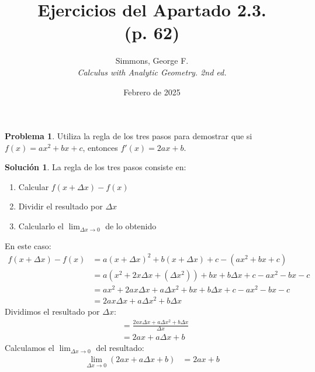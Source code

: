 \documentclass{article}
\theoremstyle{definition}
\newtheorem{problem}{Problema}
\newtheorem*{solution}{Solución}
\begin{document}
\title{Ejercicios del Apartado 2.3. \\ (p. 62)}
\author{Simmons, George F. \\ \textit{Calculus with Analytic Geometry. 2nd ed.}}
\date{Febrero de 2025}
\maketitle

\begin{problem}
Utiliza la regla de los tres pasos para demostrar que si \( f(x) = ax^2 + bx + c \), entonces \( f'(x) = 2ax + b \).
\end{problem}

\medskip

\begin{solution}
La regla de los tres pasos consiste en:
    \begin{enumerate}
        \item Calcular \( f(x+\Delta x)-f(x)\)
        \item Dividir el resultado por \( \Delta x\)
        \item Calcularlo el \( \lim_{\Delta x \to 0} \) de lo obtenido
    \end{enumerate}
En este caso:
    \begin{align*}
        f(x+\Delta x) - f(x) &= a(x+ \Delta x)^2+b(x+\Delta x)+c-(ax^2+bx+c) \\
        &= a(x^2+2x\Delta x+(\Delta x^2))+bx+b\Delta x+c-ax^2-bx-c \\
        &= ax^2+2ax\Delta x+a\Delta x^2+bx+b\Delta x+c-ax^2-bx-c \\
        &=2ax\Delta x+a\Delta x^2+b\Delta x
    \end{align*}
Dividimos el resultado por \( \Delta x \):
    \begin{align*}
        &= \frac{2ax\Delta x+a\Delta x^2+b\Delta x}{\Delta x} \\
        &= 2ax + a \Delta x + b
    \end{align*}
Calculamos el \( \lim_{\Delta x \to 0} \) del resultado:
    \begin{align*}
        \lim_{\Delta x \to 0} (2ax + a \Delta x + b) &= 2ax+b
    \end{align*}
\end{solution}

\bigskip
\end{document}
